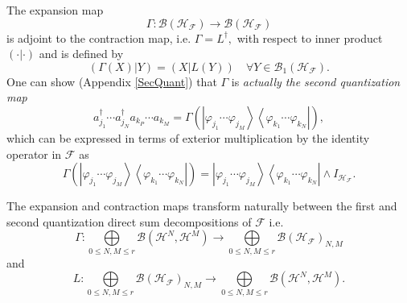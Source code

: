 \documentclass[aps,preprint]{revtex4}%
\begin{document}
The expansion map
\begin{equation}
\Gamma:\mathcal{B}\left(  \mathcal{H}_{\mathcal{F}}\right)  \rightarrow
\mathcal{B}\left(  \mathcal{H}_{\mathcal{F}}\right)
\end{equation}
is adjoint to the contraction map, i.e. $\Gamma=L^{\dagger},$ with respect to
inner product $\left(  \cdot\left\vert \cdot\right.  \right)  $ and is defined
by
\begin{equation}
\left(  \Gamma\left(  X\right)  \left\vert Y\right.  \right)  =\left(
X\left\vert L\left(  Y\right)  \right.  \right)  \quad\forall Y\in
\mathcal{B}_{1}\left(  \mathcal{H}_{\mathcal{F}}\right)  .
\end{equation}
One can show (Appendix \ref{SecQuant}) that $\Gamma$ is \emph{actually the
second quantization map}
\begin{equation}
a_{j_{1}}^{\dagger}\cdots a_{j_{N}}^{\dagger}a_{k_{P}}\cdots a_{k_{M}}%
=\Gamma\left(  \left\vert \varphi_{j_{1}}\cdots\varphi_{j_{M}}\right\rangle
\left\langle \varphi_{k_{1}}\cdots\varphi_{k_{N}}\right\vert \right)  ,
\end{equation}
which can be expressed in terms of exterior multiplication by the identity
operator in $\mathcal{F}$ as
\begin{equation}
\Gamma\left(  \left\vert \varphi_{j_{1}}\cdots\varphi_{j_{M}}\right\rangle
\left\langle \varphi_{k_{1}}\cdots\varphi_{k_{N}}\right\vert \right)
=\left\vert \varphi_{j_{1}}\cdots\varphi_{j_{M}}\right\rangle \left\langle
\varphi_{k_{1}}\cdots\varphi_{k_{N}}\right\vert \wedge I_{\mathcal{H}%
_{\mathcal{F}}}.
\end{equation}


The expansion and contraction maps transform naturally between the first and
second quantization direct sum decompositions of $\mathcal{F}$ i.e.
\begin{equation}
\Gamma:%
{\displaystyle\bigoplus\limits_{0\leq N,M\leq r}}
\mathcal{B}\left(  \mathcal{H}^{N},\mathcal{H}^{M}\right)  \rightarrow%
{\displaystyle\bigoplus\limits_{0\leq N,M\leq r}}
\mathcal{B}\left(  \mathcal{H}_{\mathcal{F}}\right)  _{N,M}%
\end{equation}
and
\begin{equation}
L:%
{\displaystyle\bigoplus\limits_{0\leq N,M\leq r}}
\mathcal{B}\left(  \mathcal{H}_{\mathcal{F}}\right)  _{N,M}\rightarrow%
{\displaystyle\bigoplus\limits_{0\leq N,M\leq r}}
\mathcal{B}\left(  \mathcal{H}^{N},\mathcal{H}^{M}\right)  .
\end{equation}
\end{document}

